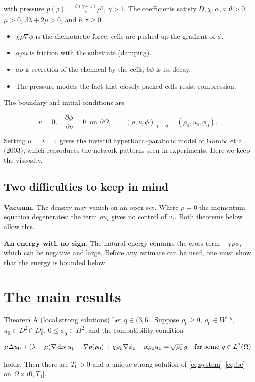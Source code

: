 with pressure $p(\rho) = \frac{\theta(\gamma-1)}{\gamma}\rho^\gamma$, $\gamma > 1$. The coefficients satisfy $D, \chi, \alpha, a, \theta > 0$, $\mu > 0$, $3\lambda + 2\mu > 0$, and $b, \sigma \ge 0$.

\begin{itemize}
\item $\chi \rho \nabla \phi$ is the chemotactic force: cells are pushed up the gradient of $\phi$.
\item $\alpha \rho u$ is friction with the substrate (damping).
\item $a\rho$ is secretion of the chemical by the cells; $b\phi$ is its decay.
\item The pressure models the fact that closely packed cells resist compression.
\end{itemize}

The boundary and initial conditions are

\begin{equation}\label{eq:bc}
    u = 0, \quad \frac{\partial \phi}{\partial \nu} = 0 \ \text{ on } \partial\Omega, \qquad
    (\rho, u, \phi)|_{t=0} = (\rho_0, u_0, \phi_0).
  \end{equation}

Setting $\mu = \lambda = 0$ gives the inviscid hyperbolic--parabolic model of Gamba et al. (2003), which reproduces the network patterns seen in experiments. Here we keep the viscosity.

\subsection*{Two difficulties to keep in mind}

\textbf{Vacuum.} The density may vanish on an open set. Where $\rho = 0$ the momentum equation degenerates: the term $\rho u_t$ gives no control of $u_t$. Both theorems below allow this.

\textbf{An energy with no sign.} The natural energy contains the cross term $-\chi\rho\phi$, which can be negative and large. Before any estimate can be used, one must show that the energy is bounded below.

\section{The main results}

\begin{thmbox}{Theorem A (local strong solutions)}
%
Let $q \in (3,6]$. Suppose $\rho_0 \ge 0$, $\rho_0 \in W^{1,q}$, $u_0 \in D^2 \cap D^1_0$, $0 \le \phi_0 \in H^2$, and the compatibility condition

\begin{equation}\label{eq:compat}
      \mu \Delta u_0 + (\lambda+\mu)\nabla \dv u_0 - \nabla p(\rho_0) + \chi \rho_0 \nabla \phi_0 - \alpha \rho_0 u_0
      = \sqrt{\rho_0}\, g \quad \text{for some } g \in L^2(\Omega)
    \end{equation}

holds. Then there are $T_0 > 0$ and a unique strong solution of \eqref{eq:system}--\eqref{eq:bc} on $\Omega \times (0, T_0]$.
\end{thmbox}

